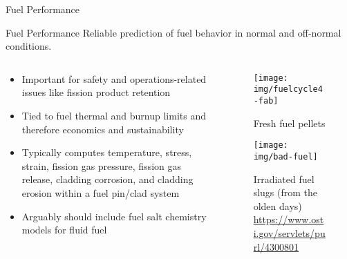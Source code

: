 \documentclass[pdf,aspectratio=169]{beamer}
\begin{document}
\begin{frame}[plain,c]
	\begin{center}
	\Huge Fuel Performance
	\end{center}
\end{frame}

\begin{frame}{Fuel Performance}
    Reliable prediction of fuel behavior in normal and off-normal conditions.
    \begin{columns}
    \begin{column}{0.5\textwidth}
        \begin{itemize}
            \item Important for safety and operations-related issues like fission product retention
            \item Tied to fuel thermal and burnup limits and therefore economics and
                sustainability
            \item Typically computes temperature, stress, strain, fission gas pressure,
                fission gas release, cladding corrosion, and cladding erosion within a
                fuel pin/clad system
            \item Arguably should include fuel salt chemistry models for fluid fuel
        \end{itemize}
    \end{column}
    \begin{column}{0.5\textwidth}
        \begin{figure}[ht]
        \centering
            \texttt{[image: img/fuelcycle4-fab]}
            \caption{\tiny Fresh fuel pellets}
        \end{figure}
        \begin{figure}[ht]
        \centering
            \texttt{[image: img/bad-fuel]}
            \caption{\tiny Irradiated fuel slugs (from the olden days)
            \url{https://www.osti.gov/servlets/purl/4300801}} 
        \end{figure}
    \end{column}
\end{columns}
\end{frame}
\end{document}
